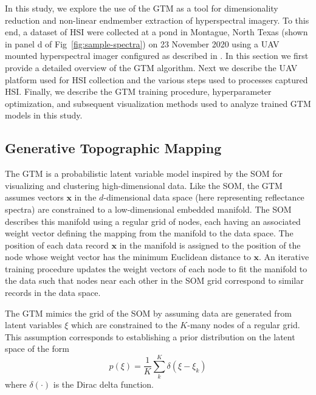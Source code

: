 \documentclass[remotesensing,article,submit,pdftex,moreauthors]{Definitions/mdpi}
\begin{document}
In this study, we explore the use of the GTM as a tool for dimensionality reduction and non-linear endmember extraction of hyperspectral imagery. To this end, a dataset of HSI were collected at a pond in Montague, North Texas (shown in panel d of Fig~\ref{fig:sample-spectra}) on 23 November 2020 using a UAV mounted hyperspectral imager configured as described in \cite{robot-team-1, robot-team-2}. In this section we first provide a detailed overview of the GTM algorithm. Next we describe the UAV platform used for HSI collection and the various steps used to processes captured HSI. Finally, we describe the GTM training procedure, hyperparameter optimization, and subsequent visualization methods used to analyze trained GTM models in this study.

\subsection{Generative Topographic Mapping}


The GTM is a probabilistic latent variable model inspired by the SOM for visualizing and clustering high-dimensional data. Like the SOM, the GTM assumes vectors $\mathbf{x}$ in the $d$-dimensional data space (here representing reflectance spectra) are constrained to a low-dimensional embedded manifold. The SOM describes this manifold using a regular grid of nodes, each having an associated weight vector defining the mapping from the manifold to the data space. The position of each data record $\mathbf{x}$ in the manifold is assigned to the position of the node whose weight vector has the minimum Euclidean distance to $\mathbf{x}$. An iterative training procedure updates the weight vectors of each node to fit the manifold to the data such that nodes near each other in the SOM grid correspond to similar records in the data space.

The GTM mimics the grid of the SOM by assuming data are generated from latent variables $\xi$ which are constrained to the $K$-many nodes of a regular grid. This assumption corresponds to establishing a prior distribution on the latent space of the form
\begin{equation}\label{eq:latent-prob}
    p(\xi) = \frac{1}{K}\sum_k^K \delta(\xi - \xi_k)
\end{equation}
where $\delta(\cdot)$ is the Dirac delta function.
\end{document}

